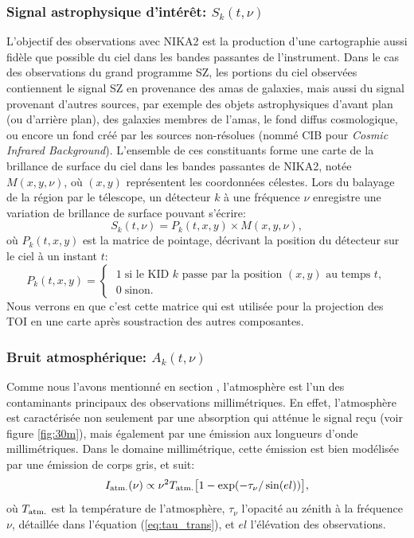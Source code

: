 \subsubsection{Signal astrophysique d'intérêt: $S_k(t, \nu)$} %
L'objectif des observations avec NIKA2 est la production d'une cartographie aussi fidèle que possible du ciel dans les bandes passantes de l'instrument.
Dans le cas des observations du grand programme SZ, les portions du ciel observées contiennent le signal SZ en provenance des amas de galaxies, mais aussi du signal provenant d'autres sources, par exemple des objets astrophysiques d'avant plan (ou d'arrière plan), des galaxies membres de l'amas, le fond diffus cosmologique, ou encore un fond créé par les sources non-résolues (nommé CIB pour \textit{Cosmic Infrared Background}).
L'ensemble de ces constituants forme une carte de la brillance de surface du ciel dans les bandes passantes de NIKA2, notée $M(x, y, \nu)$, où $(x, y)$ représentent les coordonnées célestes.
Lors du balayage de la région par le télescope, un détecteur $k$ à une fréquence $\nu$ enregistre une variation de brillance de surface pouvant s'écrire:
\begin{equation}
    \label{eq:toi_to_map}
    S_k(t, \nu) = P_k(t, x, y) \times M(x, y, \nu),
\end{equation}
où $P_k(t, x, y)$ est la matrice de pointage, décrivant la position du détecteur sur le ciel à un instant $t$:
\begin{equation}
    \label{eq:pointing_matrix}
    P_k(t, x, y) =
        \begin{cases}
            \; 1 \;\text{si le KID $k$ passe par la position $(x, y)$ au temps $t$}, \\
            \; 0 \;\text{sinon.}
        \end{cases}
\end{equation}
Nous verrons en  que c'est cette matrice qui est utilisée pour la projection des TOI en une carte après soustraction des autres composantes.

\subsubsection{Bruit atmosphérique: $A_k(t, \nu)$} %
Comme nous l'avons mentionné en section , l'atmosphère est l'un des contaminants principaux des observations millimétriques.
En effet, l'atmosphère est caractérisée non seulement par une absorption qui atténue le signal reçu (voir figure \ref{fig:30m}), mais également par une émission aux longueurs d'onde millimétriques.
Dans le domaine millimétrique, cette émission est bien modélisée par une émission de corps gris, et suit:
\begin{equation}
    I_{\rm atm.}(\nu) \propto \nu^2 T_{\rm atm.} \big[ 1 - \exp(-\tau_\nu / \sin(el)) \big],
\end{equation}
où $T_{\rm atm.}$ est la température de l'atmosphère, $\tau_\nu$ l'opacité au zénith à la fréquence $\nu$, détaillée dans l'équation (\ref{eq:tau_trans}), et $el$ l'élévation des observations.

